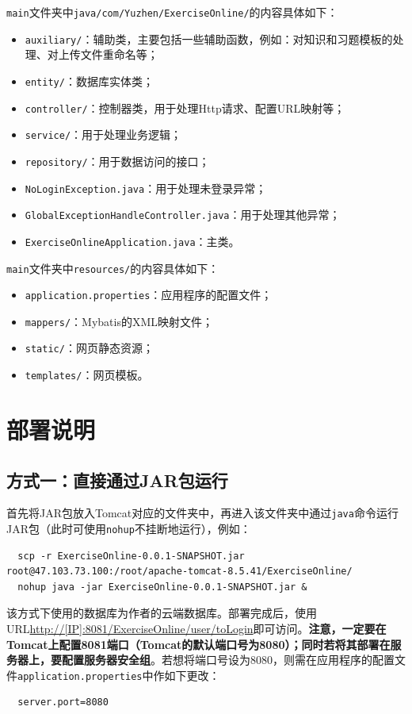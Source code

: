 \documentclass{nwafucoursepaper}
\begin{document}
\verb|main|文件夹中\verb|java/com/Yuzhen/ExerciseOnline/|的内容具体如下：
\begin{itemize}
    \item \verb|auxiliary/|：辅助类，主要包括一些辅助函数，例如：对知识和习题模板的处理、对上传文件重命名等；
    \item \verb|entity/|：数据库实体类；
    \item \verb|controller/|：控制器类，用于处理Http请求、配置URL映射等；
    \item \verb|service/|：用于处理业务逻辑；
    \item \verb|repository/|：用于数据访问的接口；
    \item \verb|NoLoginException.java|：用于处理未登录异常；
    \item \verb|GlobalExceptionHandleController.java|：用于处理其他异常；
    \item \verb|ExerciseOnlineApplication.java|：主类。
\end{itemize}

\verb|main|文件夹中\verb|resources/|的内容具体如下：
\begin{itemize}
    \item \verb|application.properties|：应用程序的配置文件；
    \item \verb|mappers/|：Mybatis的XML映射文件；
    \item \verb|static/|：网页静态资源；
    \item \verb|templates/|：网页模板。
\end{itemize}

\section{部署说明}

\subsection{方式一：直接通过JAR包运行}

首先将JAR包放入Tomcat对应的文件夹中，再进入该文件夹中通过\verb|java|命令运行JAR包（此时可使用\verb|nohup|不挂断地运行），例如：
\begin{lstlisting}
  scp -r ExerciseOnline-0.0.1-SNAPSHOT.jar root@47.103.73.100:/root/apache-tomcat-8.5.41/ExerciseOnline/
  nohup java -jar ExerciseOnline-0.0.1-SNAPSHOT.jar &
\end{lstlisting}

该方式下使用的数据库为作者的云端数据库。部署完成后，使用URL\url{http://[IP]:8081/ExerciseOnline/user/toLogin}即可访问。\textbf{注意，一定要在Tomcat上配置8081端口（Tomcat的默认端口号为8080）；同时若将其部署在服务器上，要配置服务器安全组}。若想将端口号设为8080，则需在应用程序的配置文件\verb|application.properties|中作如下更改：
\begin{lstlisting}
  server.port=8080
\end{lstlisting}
\end{document}
